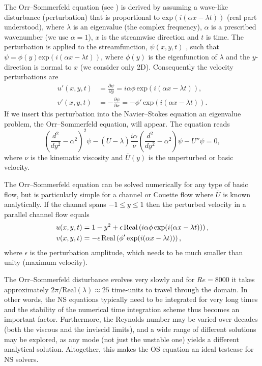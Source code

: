 The Orr--Sommerfeld equation (see \citet{Orzag1971}) is
derived by assuming a wave-like disturbance (perturbation) that is
proportional to $\text{exp}(i(\alpha x-\lambda t))$ (real part
understood), where $\lambda$ is an eigenvalue (the complex frequency),
$\alpha$ is a prescribed wavenumber (we use $\alpha=1$), $x$ is the
streamwise direction and $t$ is time. The perturbation is applied to
the streamfunction, $\psi(x,y,t)$ , such that $\psi=\phi(y)
\text{exp}(i(\alpha x- \lambda t))$, where $\phi(y)$ is the
eigenfunction of $\lambda$ and the $y$-direction is normal to $x$ (we
consider only 2D). Consequently the velocity perturbations are
\begin{align}
 u'(x,y,t)&=\frac{\partial \psi}{\partial y}=i\alpha \phi \, \text{exp}(i(\alpha x- \lambda t)),\\
 v'(x,y,t)&=-\frac{\partial \psi}{\partial x}=-\phi' \, \text{exp}(i(\alpha x- \lambda t)).
\end{align}
If we insert this perturbation into the Navier--Stokes equation an
eigenvalue problem, the Orr--Sommerfeld equation, will appear. The
equation reads
\begin{equation}
 \left( \frac{d^2}{dy^2}-\alpha^2\right)^2\psi - \left(\overline{U}-\lambda \right) \frac{i \alpha}{\nu} \left( \frac{d^2}{dy^2}-\alpha^2\right)\psi - \overline{U}''\psi=0,
 \label{eq:mortensen:OrrS}
\end{equation}
where $\nu$ is the kinematic viscosity and $\overline{U}(y)$ is the unperturbed or basic velocity.

The Orr--Sommerfeld equation can be solved numerically for any type of
basic flow, but is particularly simple for a channel or Couette flow
where $\overline{U}$ is known analytically. If the channel spans
$-1\leqslant y \leqslant 1$ then the perturbed velocity in a parallel channel
flow equals
\begin{align}
 u(x,y,t)&=1-y^2+\epsilon \,\text{Real}\left(i\alpha \phi \, \text{exp}(i(\alpha x-\lambda t))\right), \notag \\
 v(x,y,t)&=-\epsilon \, \text{Real}\left(\phi' \, \text{exp}(i(\alpha x-\lambda t))\right),
\label{eq:mortensen:channel}
\end{align}
where $\epsilon$ is the perturbation amplitude, which needs to be much smaller than unity (maximum velocity).

The Orr--Sommerfeld disturbance evolves very slowly and for $Re=8000$
it takes approximately $2 \pi/\text{Real}(\lambda)\approx 25$
time-units to travel through the domain. In other words, the NS
equations typically need to be integrated for very long times and the
stability of the numerical time integration scheme thus becomes an
important factor. Furthermore, the Reynolds number may be varied over
decades (both the viscous and the inviscid limits), and a wide range
of different solutions may be explored, as any mode (not just the
unstable one) yields a different analytical solution. Altogether,
this makes the OS equation an ideal testcase for NS solvers.

